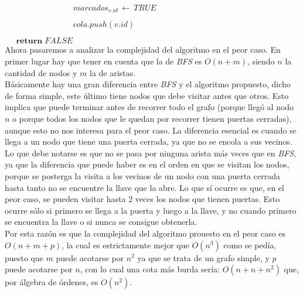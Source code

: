 $\; \; \; \; \; \; \; \; \; \; \; \; \; \; \; \; \; \; \; \; \; \; \; \; \; \; \; \; \; \; marcados_{v.id} \, \longleftarrow \, TRUE$

$\; \; \; \; \; \; \; \; \; \; \; \; \; \; \; \; \; \; \; \; \; \; \; \; \; \; \; \; \; \; cola.push(v.id)$

$\; \; \; \; \; \textbf{return} \; FALSE$ \\

Ahora pasaremos a analizar la complejidad del algoritmo en el peor caso. En primer lugar hay que tener en cuenta que la de \textit{BFS} es $O(n+m)$, siendo $n$ la cantidad de nodos y $m$ la de aristas. \\

Básicamente hay una gran diferencia entre \textit{BFS} y el algoritmo propuesto, dicho de forma simple, este último tiene nodos que debe visitar antes que otros. Esto implica que puede terminar antes de recorrer todo el grafo (porque llegó al nodo $n$ o porque todos los nodos que le quedan por recorrer tienen puertas cerradas), aunque esto no nos interesa para el peor caso. La diferencia esencial es cuando se llega a un nodo que tiene una puerta cerrada, ya que no se encola a sus vecinos. Lo que debe notarse es que no se pasa por ninguna arista más veces que en \textit{BFS}, ya que la diferencia que puede haber es en el orden en que se visitan los nodos, porque se posterga la visita a los vecinos de un nodo con una puerta cerrada hasta tanto no se encuentre la llave que la abre. Lo que sí ocurre es que, en el peor caso, se pueden visitar hasta 2 veces los nodos que tienen puertas. Esto ocurre sólo si primero se llega a la puerta y luego a la llave, y no cuando primero se encuentra la llave o si nunca se consigue obtenerla. \\

Por esta razón es que la complejidad del algoritmo prouesto en el peor caso es $O(n+m+p)$, la cual es estrictamente mejor que $O(n^3)$ como se pedía, puesto que $m$ puede acotarse por $n^2$ ya que se trata de un grafo simple, y $p$ puede acotarse por $n$, con lo cual una cota más burda sería: $O(n+n+n^2)$ que, por álgebra de órdenes, es $O(n^2)$. \\
